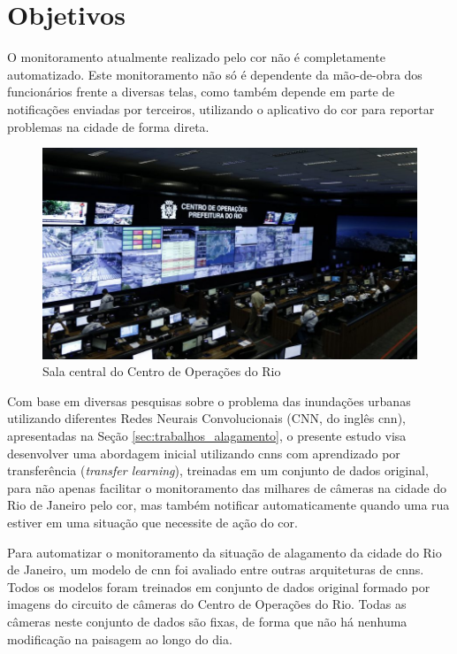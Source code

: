 \section{Objetivos}

O monitoramento atualmente realizado pelo \acrshort{cor} não é completamente automatizado. Este monitoramento não só é dependente da mão-de-obra dos funcionários frente a diversas telas, como também depende em parte de notificações enviadas por terceiros, utilizando o aplicativo do \acrshort{cor} para reportar problemas na cidade de forma direta.

\begin{figure}[htb]
\centerline{\includegraphics[width=0.9\linewidth]{images/46627458084_451cf87027_k.jpg}}
\caption{Sala central do Centro de Operações do Rio}
\label{fig:cor}
\end{figure}

Com base em diversas pesquisas sobre o problema das inundações urbanas utilizando diferentes Redes Neurais Convolucionais (CNN, do inglês \acrlong{cnn}),
apresentadas na Seção \ref{sec:trabalhos_alagamento}, 
o presente estudo visa desenvolver uma abordagem inicial utilizando \acrshort{cnn}s com aprendizado por transferência (\textit{transfer learning}), treinadas em um conjunto de dados original, 
para não apenas facilitar o monitoramento das milhares de câmeras na cidade do Rio de Janeiro pelo \acrshort{cor}, 
mas também notificar automaticamente quando uma rua estiver em uma situação que necessite de ação do \acrshort{cor}.


Para automatizar o monitoramento da situação de alagamento da cidade do Rio de Janeiro, um modelo de \acrshort{cnn} foi avaliado entre outras arquiteturas de \acrshort{cnn}s. Todos os modelos foram treinados em conjunto de dados original formado por imagens do circuito de câmeras do Centro de Operações do Rio.
Todas as câmeras neste conjunto de dados são fixas, de forma que não há nenhuma modificação na paisagem ao longo do dia.

